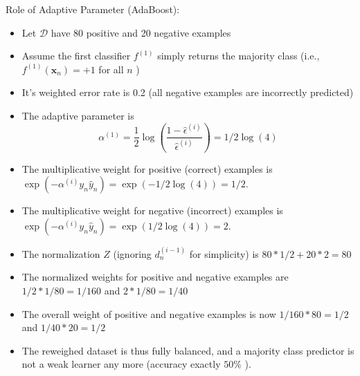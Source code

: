 \vspace{0.6cm}

\noindent
Role of Adaptive Parameter (AdaBoost):
\begin{itemize}
	\item Let $\mathcal{D}$ have 80 positive and 20 negative examples

	\item Assume the first classifier $f^{(1)}$ simply returns the majority class (i.e.,
		$f^{(1)}\left(\mathbf{x}_{n}\right)=+1$ for all $n$ )

	\item It's weighted error rate is 0.2 (all negative examples are incorrectly
		predicted)

	\item The adaptive parameter is
		\[
			\alpha^{(1)}=\frac{1}{2}\log \left(\frac{1-\hat{\epsilon}^{(i)}}{\hat{\epsilon}^{(i)}}
			\right)=1 / 2 \log (4)
		\]

	\item The multiplicative weight for positive (correct) examples is $\exp \left(
		-\alpha^{(i)}y_{n}\hat{y}_{n}\right)=\exp (-1 / 2 \log (4))=1 / 2$.

	\item The multiplicative weight for negative (incorrect) examples is $\exp \left
		(-\alpha^{(i)}y_{n}\hat{y}_{n}\right)=\exp (1 / 2 \log (4))=2$.

	\item The normalization $Z$ (ignoring $d_{n}^{(i-1)}$ for simplicity) is $80 *
		1 / 2+20 * 2=80$

	\item The normalized weights for positive and negative examples are $1 / 2 * 1
		/ 80=1 / 160$ and $2 * 1 / 80=1 / 40$

	\item The overall weight of positive and negative examples is now $1 / 160 * 80
		=1 / 2$ and $1 / 40 * 20=1 / 2$

	\item The reweighed dataset is thus fully balanced, and a majority class
		predictor is not a weak learner any more (accuracy exactly $50 \%$ ).
\end{itemize}